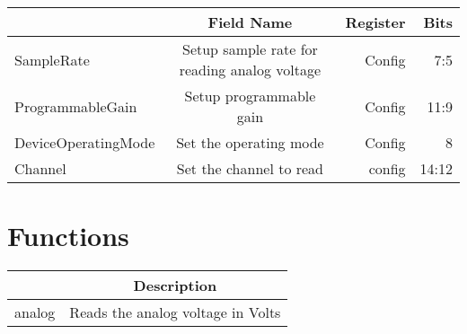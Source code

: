 \documentclass[a4paper,12pt,oneside,pdflatex,italian,final,twocolumn]{article}
\begin{document}
\centering
\begin{tabular}{lcrr}
\toprule
  & Field Name & Register & Bits \\
\midrule
SampleRate & Setup sample rate for reading analog voltage & Config &
7:5
\\

ProgrammableGain & Setup programmable gain & Config &
11:9
\\

DeviceOperatingMode & Set the operating mode & Config &
8
\\

Channel & Set the channel to read & config &
14:12
\\

\bottomrule
\end{tabular}

\raggedright

\section{Functions}

\centering
\begin{tabular}{lc}
\toprule
  & Description \\
\midrule
analog & Reads the analog voltage in Volts \\
\bottomrule
\end{tabular}
\end{document}
